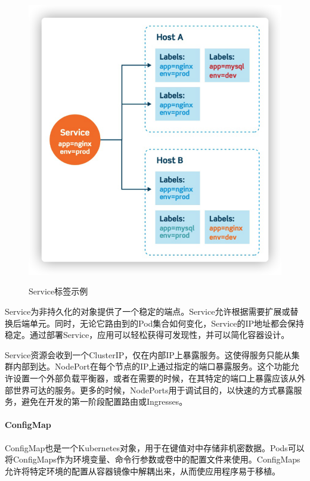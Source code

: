 \documentclass[macfonts,master]{njuthesis}
\begin{document}
\begin{figure}[htbp]
  \centering
  \includegraphics[width= 1\textwidth]{pics/service.png}\\
  \caption{Service标签示例\cite{gorillaguide}}\label{fig:service}
\end{figure}

Service为非持久化的对象提供了一个稳定的端点。Service允许根据需要扩展或替换后端单元。同时，无论它路由到的Pod集合如何变化，Service的IP地址都会保持稳定\cite{introk8s}。通过部署Service，应用可以轻松获得可发现性，并可以简化容器设计。

Service资源会收到一个ClusterIP，仅在内部IP上暴露服务\cite{gorillaguide}。这使得服务只能从集群内部到达。NodePort在每个节点的IP上通过指定的端口暴露服务。这个功能允许设置一个外部负载平衡器，或者在需要的时候，在其特定的端口上暴露应该从外部世界可达的服务。更多的时候，NodePorts用于调试目的，以快速的方式暴露服务，避免在开发的第一阶段配置路由或Ingresses。

\paragraph{ConfigMap}
ConfigMap也是一个Kubernetes对象，用于在键值对中存储非机密数据。Pods可以将ConfigMaps作为环境变量、命令行参数或卷中的配置文件来使用。ConfigMaps允许将特定环境的配置从容器镜像中解耦出来，从而使应用程序易于移植。
\end{document}
